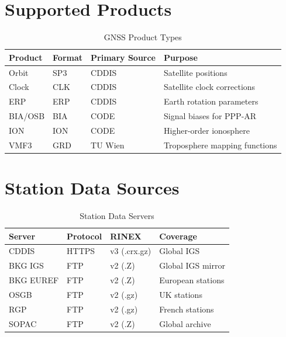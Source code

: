 \documentclass[11pt,a4paper,twoside]{report}
\begin{document}
\section{Supported Products}

\begin{table}[H]
\centering
\caption{GNSS Product Types}
\label{tab:products}
\begin{tabular}{@{}lllp{4cm}@{}}
\toprule
\textbf{Product} & \textbf{Format} & \textbf{Primary Source} & \textbf{Purpose} \\
\midrule
Orbit & SP3 & CDDIS & Satellite positions \\
Clock & CLK & CDDIS & Satellite clock corrections \\
ERP & ERP & CDDIS & Earth rotation parameters \\
BIA/OSB & BIA & CODE & Signal biases for PPP-AR \\
ION & ION & CODE & Higher-order ionosphere \\
VMF3 & GRD & TU Wien & Troposphere mapping functions \\
\bottomrule
\end{tabular}
\end{table}

\section{Station Data Sources}

\begin{table}[H]
\centering
\caption{Station Data Servers}
\label{tab:station-servers}
\begin{tabular}{@{}lllp{4cm}@{}}
\toprule
\textbf{Server} & \textbf{Protocol} & \textbf{RINEX} & \textbf{Coverage} \\
\midrule
CDDIS & HTTPS & v3 (.crx.gz) & Global IGS \\
BKG IGS & FTP & v2 (.Z) & Global IGS mirror \\
BKG EUREF & FTP & v2 (.Z) & European stations \\
OSGB & FTP & v2 (.gz) & UK stations \\
RGP & FTP & v2 (.gz) & French stations \\
SOPAC & FTP & v2 (.Z) & Global archive \\
\bottomrule
\end{tabular}
\end{table}

\end{document}
